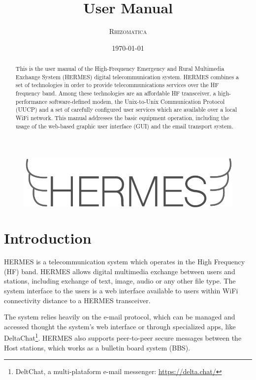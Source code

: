 \documentclass[11pt,a4paper]{article}
\title{User Manual}
\author{
        \textsc{Rhizomatica}\\
}
\date{\today}
\begin{document}
\maketitle

\begin{figure}[!ht]
\includegraphics[width=1\textwidth]{pictures/logoh.png}
\end{figure}

\begin{abstract}

This is the user manual of the High-Frequency Emergency and Rural Multimedia Exchange System (HERMES) digital telecommunication system. HERMES combines a set of technologies in order to provide telecommunications services over the HF frequency band. Among these technologies are an affordable HF transceiver, a high-performance software-defined modem, the Unix-to-Unix Communication Protocol (UUCP) and a set of carefully configured user services which are available over a local WiFi network. This manual addresses the basic equipment operation, including the usage of the web-based graphic user interface (GUI) and the email transport system.

\end{abstract}

\newpage

\tableofcontents

\setlength{\parindent}{0em}
\setlength{\parskip}{1em}

\section{Introduction}

HERMES is a telecommunication system which operates in the High Frequency (HF) band. HERMES allows digital multimedia exchange between users and stations, including exchange of text, image, audio or any other file type. The system interface to the users is a web interface available to users within WiFi connectivity distance to a HERMES transceiver.  

The system relies heavily on the e-mail protocol, which can be managed and accessed thought the system's web interface or through specialized apps, like DeltaChat\footnote{DeltChat, a multi-plataform e-mail messenger: \url{https://delta.chat/} }. HERMES also supports peer-to-peer secure messages between the Host stations, which works as a bulletin board system (BBS).
\end{document}
